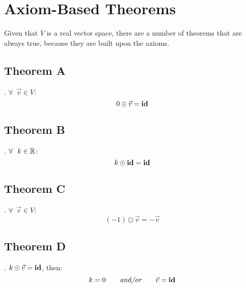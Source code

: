 \section{Axiom-Based Theorems}
Given that $V$ is a real vector space, there are a number of
theorems that are always true, because they are built upon the axioms.

\subsection*{Theorem A}
.
$\forall~~\vec{v} \in V$:
\[
  0 \odot \vec{v} = \operatorname{\textbf{id}}
\]

\subsection*{Theorem B}
.
$\forall~~k \in \mathbb{R}$:
\[
  k \odot \operatorname{\textbf{id}} = \operatorname{\textbf{id}}
\]

\subsection*{Theorem C}
.
$\forall~~\vec{v} \in V$:
\[
  (-1) \odot \vec{v} = -\vec{v}
\]

\subsection*{Theorem D}
.
 $k \odot \vec{v} = \operatorname{\textbf{id}}$, then:
\[
  k = 0\qquad\textit{and/or}\qquad\vec{v} = \operatorname{\textbf{id}}
\]